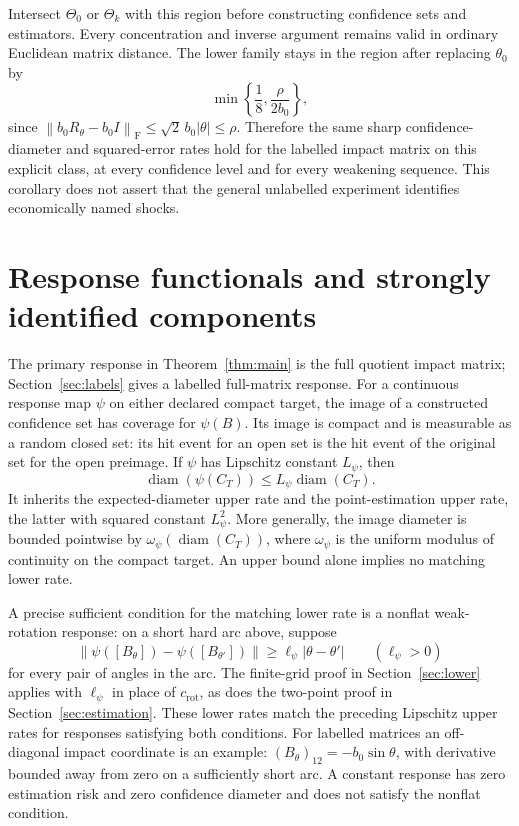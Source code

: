 \documentclass[11pt,a4paper]{article}
\numberwithin{equation}{section}
\newcommand{\F}{\mathrm F}
\newcommand{\norm}[1]{\left\lVert #1\right\rVert}
\DeclareMathOperator{\diam}{diam}
\begin{document}
Intersect \(\Theta_0\) or \(\Theta_k\) with this region before constructing
confidence sets and estimators. Every concentration and inverse argument
remains valid in ordinary Euclidean matrix distance.
The lower family stays in the region after replacing \(\theta_0\) by
\[
 \min\left\{\frac18,\frac{\rho}{2b_0}\right\},
\]
since \(\norm{b_0R_\theta-b_0I}_{\F}
\le\sqrt2\,b_0|\theta|\le\rho\).
Therefore the same sharp confidence-diameter and squared-error rates
hold for the labelled impact matrix on this explicit class, at every
confidence level and for every weakening sequence.
This corollary does not assert that the
general unlabelled experiment identifies economically named shocks.

\section{Response functionals and strongly identified components}
\label{sec:responses}
The primary response in Theorem~\ref{thm:main} is the full quotient
impact matrix; Section~\ref{sec:labels} gives a labelled full-matrix
response. For a continuous response map \(\psi\) on either declared
compact target, the image of a constructed confidence set has coverage
for \(\psi(B)\). Its image is compact and is measurable as a random
closed set: its hit event for an open set is the hit event of the original
set for the open preimage.
If \(\psi\) has Lipschitz constant \(L_\psi\), then
\[
 \diam(\psi(C_T))\le L_\psi\diam(C_T).
\]
It inherits the expected-diameter upper rate and the point-estimation
upper rate, the latter with squared constant \(L_\psi^2\).
More generally, the image diameter is bounded pointwise by
\(\omega_\psi(\diam(C_T))\), where \(\omega_\psi\) is the uniform modulus
of continuity on the compact target. An upper bound alone implies no
matching lower rate.

A precise sufficient condition for the matching lower rate is a
nonflat weak-rotation response: on a short hard arc above, suppose
\[
 \norm{\psi([B_\theta])-\psi([B_{\theta'}])}
 \ge\ell_\psi|\theta-\theta'|\qquad(\ell_\psi>0)
\]
for every pair of angles in the arc.
The finite-grid proof in Section~\ref{sec:lower} applies with
\(\ell_\psi\) in place of \(c_{\mathrm{rot}}\), as does the two-point
proof in Section~\ref{sec:estimation}.
These lower rates match the preceding Lipschitz upper rates for
responses satisfying both conditions.
For labelled matrices an off-diagonal impact coordinate is an example:
\((B_\theta)_{12}=-b_0\sin\theta\), with derivative bounded away from
zero on a sufficiently short arc.
A constant response has zero estimation risk and zero confidence
diameter and does not satisfy the nonflat condition.
\end{document}
